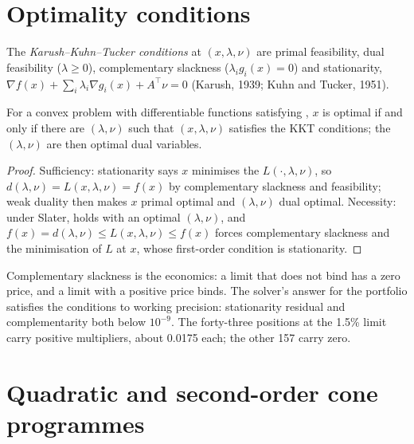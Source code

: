 \section{Optimality conditions}

\begin{definition}\label{def:qm:convex-optimisation:kkt}
The \emph{Karush--Kuhn--Tucker conditions} at $(x, \lambda, \nu)$ are primal feasibility, dual feasibility ($\lambda \ge 0$), complementary
slackness ($\lambda_ig_i(x) = 0$) and stationarity, $\nabla f(x) + \sum_i\lambda_i\nabla g_i(x) + A^\top\nu = 0$ (Karush, 1939; Kuhn and Tucker, 1951).
\end{definition}

\begin{theorem}\label{thm:qm:convex-optimisation:kkt}
For a convex problem with differentiable functions satisfying , $x$ is optimal if and only if there are $(\lambda, \nu)$ such that $(x, \lambda, \nu)$ satisfies
the KKT conditions; the $(\lambda, \nu)$ are then optimal dual variables.
\end{theorem}

\begin{proof}
Sufficiency: stationarity says $x$ minimises the  $L(\cdot, \lambda, \nu)$, so $d(\lambda, \nu) = L(x, \lambda, \nu) = f(x)$ by complementary slackness and
feasibility; weak duality then makes $x$ primal optimal and $(\lambda, \nu)$ dual optimal. Necessity: under Slater,  holds with an optimal $(\lambda, \nu)$, and
$f(x) = d(\lambda, \nu) \le L(x, \lambda, \nu) \le f(x)$ forces complementary slackness and the minimisation of $L$ at $x$, whose first-order condition is stationarity.
\end{proof}

Complementary slackness is the economics: a limit that does not bind has a zero price, and a limit with a positive price binds. The solver's answer for the portfolio satisfies the
conditions to working precision: stationarity residual and complementarity both below $10^{-9}$. The forty-three positions at the 1.5\% limit carry positive multipliers,
about 0.0175 each; the other 157 carry zero.

\section{Quadratic and second-order cone programmes}

